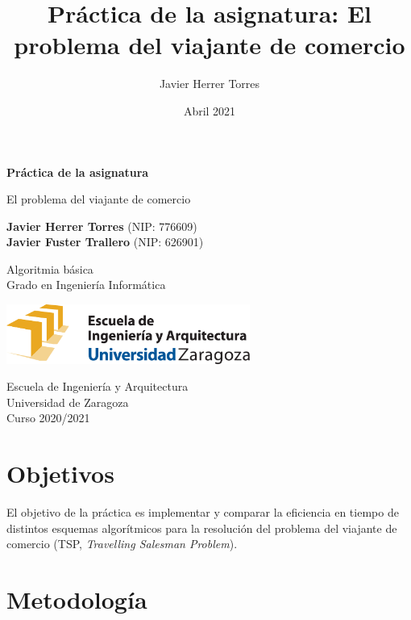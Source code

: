 \documentclass{article}
\title{Práctica de la asignatura: El problema del viajante de comercio}
\author{Javier Herrer Torres}
\date{Abril 2021}
\begin{document}
\begin{titlepage}
    \begin{center}
        \vspace*{1cm}
            
        \Huge
        \textbf{Práctica de la asignatura}
            
        \vspace{0.5cm}
        \LARGE
        El problema del viajante de comercio
            
        \vspace{1.5cm}
            
        \textbf{Javier Herrer Torres} (NIP: 776609)\\
        \textbf{Javier Fuster Trallero} (NIP: 626901)
            
        \vfill
            
        Algoritmia básica\\
        Grado en Ingeniería Informática\\
            
        \vspace{1.5cm}
            
        \includegraphics[width=0.6\textwidth]{../images/eina}
            
        \vspace{1.5cm}
            
        \Large
        Escuela de Ingeniería y Arquitectura\\
        Universidad de Zaragoza\\
        Curso 2020/2021
            
    \end{center}
\end{titlepage}

\section{Objetivos}
El objetivo de la práctica es implementar y comparar la eficiencia en tiempo de
distintos esquemas algorítmicos para la resolución del problema del viajante de
comercio (TSP, \textit{Travelling Salesman Problem}).

\section{Metodología}
\end{document}
